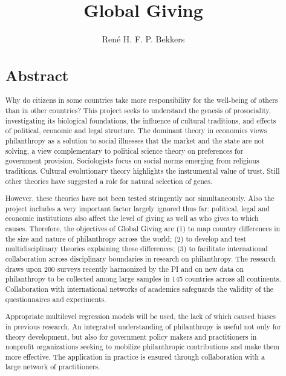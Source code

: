 \documentclass[twocolumn, serif, rga, numeric]{jote-article}
\title{Global Giving}
\author[1]{Ren\'e H. F. P. Bekkers }
\affil[1]{Department of Error, University of Trial, USA USA USA}
\begin{document}
\begin{frontmatter}
\maketitle
\begin{abstract}
     {}\section*{Abstract} 
Why do citizens in some countries take more responsibility for the well-being of others than in other countries? This project seeks to understand the genesis of prosociality, investigating its biological foundations, the influence of cultural traditions, and effects of political, economic and legal structure. The dominant theory in economics views philanthropy as a solution to social illnesses that the market and the state are not solving, a view complementary to political science theory on preferences for government provision. Sociologists focus on social norms emerging from religious traditions. Cultural evolutionary theory highlights the instrumental value of trust. Still other theories have suggested a role for natural selection of genes.

However, these theories have not been tested stringently nor simultaneously. Also the project includes a very important factor largely ignored thus far: political, legal and economic institutions also affect the level of giving as well as who gives to which causes.
Therefore, the objectives of Global Giving are (1) to map country differences in the size and nature of philanthropy across the world; (2) to develop and test multidisciplinary theories explaining these differences; (3) to facilitate international collaboration across disciplinary boundaries in research on philanthropy. The research draws upon 200 surveys recently harmonized by the PI and on new data on philanthropy to be collected among large samples in 145 countries across all continents. Collaboration with international networks of academics safeguards the validity of the questionnaires and experiments.

Appropriate multilevel regression models will be used, the lack of which caused biases in previous research. An integrated understanding of philanthropy is useful not only for theory development, but also for government policy makers and practitioners in nonprofit organizations seeking to mobilize philanthropic contributions and make them more effective. The application in practice is ensured through collaboration with a large network of practitioners.
\end{abstract}
\end{frontmatter}
\end{document}
